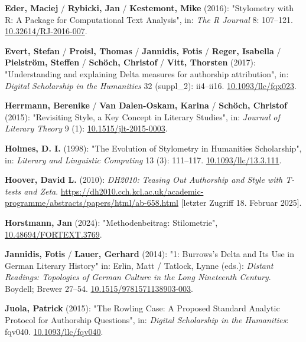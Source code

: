 \documentclass[
  12pt,
  letterpaper,
  DIV=11,
  numbers=noendperiod]{scrreprt}
\newlength{\cslhangindent}
\newenvironment{CSLReferences}[2] %
 {\begin{list}{}{%
  \setlength{\itemindent}{0pt}
  \setlength{\leftmargin}{0pt}
  \setlength{\parsep}{0pt}
  \ifodd #1
   \setlength{\leftmargin}{\cslhangindent}
   \setlength{\itemindent}{-1\cslhangindent}
  \fi
  \setlength{\itemsep}{#2\baselineskip}}}
 {\end{list}}
\begin{document}
\begin{CSLReferences}{1}{0}
\textbf{Eder, Maciej} / \textbf{Rybicki, Jan} / \textbf{Kestemont, Mike}
(2016): "Stylometry with {R}: {A} {Package} for {Computational} {Text}
{Analysis}", in: \emph{The R Journal} 8: 107--121.
\href{https://doi.org/10.32614/RJ-2016-007}{10.32614/RJ-2016-007}.

\textbf{Evert, Stefan} / \textbf{Proisl, Thomas} / \textbf{Jannidis,
Fotis} / \textbf{Reger, Isabella} / \textbf{Pielström, Steffen} /
\textbf{Schöch, Christof} / \textbf{Vitt, Thorsten} (2017):
"Understanding and explaining {Delta} measures for authorship
attribution", in: \emph{Digital Scholarship in the Humanities} 32
(suppl\_2): ii4--ii16.
\href{https://doi.org/10.1093/llc/fqx023}{10.1093/llc/fqx023}.

\textbf{Herrmann, Berenike} / \textbf{Van Dalen-Oskam, Karina} /
\textbf{Schöch, Christof} (2015): "Revisiting {Style}, a {Key} {Concept}
in {Literary} {Studies}", in: \emph{Journal of Literary Theory} 9 (1):
\href{https://doi.org/10.1515/jlt-2015-0003}{10.1515/jlt-2015-0003}.

\textbf{Holmes, D. I.} (1998): "The {Evolution} of {Stylometry} in
{Humanities} {Scholarship}", in: \emph{Literary and Linguistic
Computing} 13 (3): 111--117.
\href{https://doi.org/10.1093/llc/13.3.111}{10.1093/llc/13.3.111}.

\textbf{Hoover, David L.} (2010): \emph{{DH2010}: {Teasing} {Out}
{Authorship} and {Style} with {T}-tests and {Zeta}}.
\url{https://dh2010.cch.kcl.ac.uk/academic-programme/abstracts/papers/html/ab-658.html}
{[}letzter Zugriff 18. Februar 2025{]}.

\textbf{Horstmann, Jan} (2024): "Methodenbeitrag: {Stilometrie}",
\href{https://doi.org/10.48694/FORTEXT.3769}{10.48694/FORTEXT.3769}.

\textbf{Jannidis, Fotis} / \textbf{Lauer, Gerhard} (2014): "1:
{Burrows}'s {Delta} and {Its} {Use} in {German} {Literary} {History}"
in: Erlin, Matt / Tatlock, Lynne (eds.): \emph{Distant {Readings}:
{Topologies} of {German} {Culture} in the {Long} {Nineteenth}
{Century}}. Boydell; Brewer 27--54.
\href{https://doi.org/10.1515/9781571138903-003}{10.1515/9781571138903-003}.

\textbf{Juola, Patrick} (2015): "The {Rowling} {Case}: {A} {Proposed}
{Standard} {Analytic} {Protocol} for {Authorship} {Questions}", in:
\emph{Digital Scholarship in the Humanities}: fqv040.
\href{https://doi.org/10.1093/llc/fqv040}{10.1093/llc/fqv040}.


\end{CSLReferences}
\end{document}
